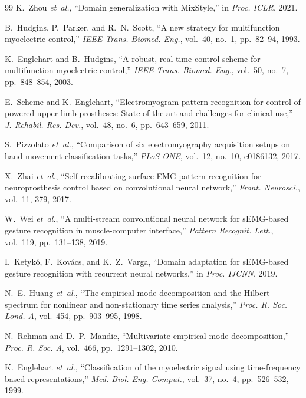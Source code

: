 \documentclass[conference]{IEEEtran}
\newcommand{\etal}{\mbox{\textit{et~al.}}}
\begin{document}
\begin{thebibliography}{99}
K.~Zhou \etal, ``Domain generalization with MixStyle,'' in \textit{Proc. ICLR}, 2021.

B.~Hudgins, P.~Parker, and R.~N.~Scott, ``A new strategy for multifunction myoelectric control,'' \textit{IEEE Trans. Biomed. Eng.}, vol.~40, no.~1, pp.~82--94, 1993.

K.~Englehart and B.~Hudgins, ``A robust, real-time control scheme for multifunction myoelectric control,'' \textit{IEEE Trans. Biomed. Eng.}, vol.~50, no.~7, pp.~848--854, 2003.

E.~Scheme and K.~Englehart, ``Electromyogram pattern recognition for control of powered upper-limb prostheses: State of the art and challenges for clinical use,'' \textit{J. Rehabil. Res. Dev.}, vol.~48, no.~6, pp.~643--659, 2011.

S.~Pizzolato \etal, ``Comparison of six electromyography acquisition setups on hand movement classification tasks,'' \textit{PLoS ONE}, vol.~12, no.~10, e0186132, 2017.

X.~Zhai \etal, ``Self-recalibrating surface EMG pattern recognition for neuroprosthesis control based on convolutional neural network,'' \textit{Front. Neurosci.}, vol.~11, 379, 2017.

W.~Wei \etal, ``A multi-stream convolutional neural network for sEMG-based gesture recognition in muscle-computer interface,'' \textit{Pattern Recognit. Lett.}, vol.~119, pp.~131--138, 2019.

I.~Ketyk\'{o}, F.~Kov\'{a}cs, and K.~Z.~Varga, ``Domain adaptation for sEMG-based gesture recognition with recurrent neural networks,'' in \textit{Proc. IJCNN}, 2019.

N.~E.~Huang \etal, ``The empirical mode decomposition and the Hilbert spectrum for nonlinear and non-stationary time series analysis,'' \textit{Proc. R. Soc. Lond. A}, vol.~454, pp.~903--995, 1998.

N.~Rehman and D.~P.~Mandic, ``Multivariate empirical mode decomposition,'' \textit{Proc. R. Soc. A}, vol.~466, pp.~1291--1302, 2010.

K.~Englehart \etal, ``Classification of the myoelectric signal using time-frequency based representations,'' \textit{Med. Biol. Eng. Comput.}, vol.~37, no.~4, pp.~526--532, 1999.


\end{thebibliography}
\end{document}
